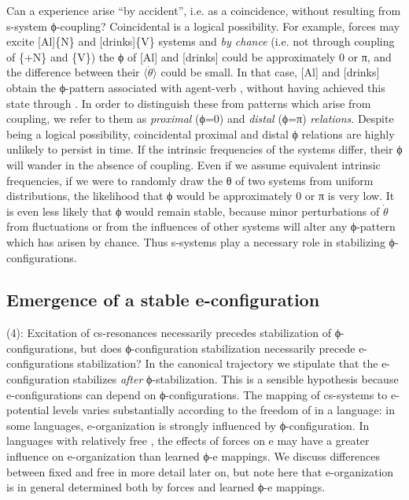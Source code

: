   Can a  experience arise “by accident”, i.e. as a coincidence, without resulting from s-system ϕ-coupling? Coincidental  is a logical possibility. For example,  forces may excite [Al]\{N\} and [drinks]\{V\} systems and \textit{by chance} (i.e. not through coupling of \{+N\} and \{V\}) the ϕ of [Al] and [drinks] could be approximately 0 or π, and the difference between their $\langle\dot{\theta}\rangle$ could be small. In that case, [Al] and [drinks] obtain the ϕ-pattern associated with agent-verb , without having achieved this state through . In order to distinguish these from patterns which arise from coupling, we refer to them as \textit{proximal} (ϕ=0) and \textit{distal} (ϕ=π) \textit{relations}. Despite being a logical possibility, coincidental proximal and distal ϕ relations are highly unlikely to persist in time. If the intrinsic frequencies of the systems differ, their ϕ will wander in the absence of coupling. Even if we assume equivalent intrinsic frequencies, if we were to randomly draw the θ of two systems from uniform distributions, the likelihood that ϕ would be approximately 0 or π is very low. It is even less likely that ϕ would remain stable, because minor perturbations of $\dot{\theta}$ from  fluctuations or from the influences of other systems will alter any ϕ-pattern which has arisen by chance. Thus s-systems play a necessary role in stabilizing ϕ-configurations.

\subsection{Emergence of a stable e-configuration}

(4): Excitation of cs-resonances necessarily precedes stabilization of ϕ-con\-fig\-u\-ra\-tions, but does ϕ-configuration stabilization necessarily precede e-con\-fig\-u\-ra\-tions stabilization? In the canonical trajectory we stipulate that the e-configuration stabilizes \textit{after} ϕ-stabilization. This is a sensible hypothesis because e-configurations can depend on ϕ-configurations. The mapping of cs-sys\-tems to e-potential levels varies substantially according to the freedom of  in a language: in some languages, e-organization is strongly influenced by ϕ-configuration. In languages with relatively free , the effects of  forces on e may have a greater influence on e-organization than learned ϕ-e mappings. We discuss differences between fixed and  free  in more detail later on, but note here that e-organization is in general determined both by  forces and learned ϕ-e mappings.


